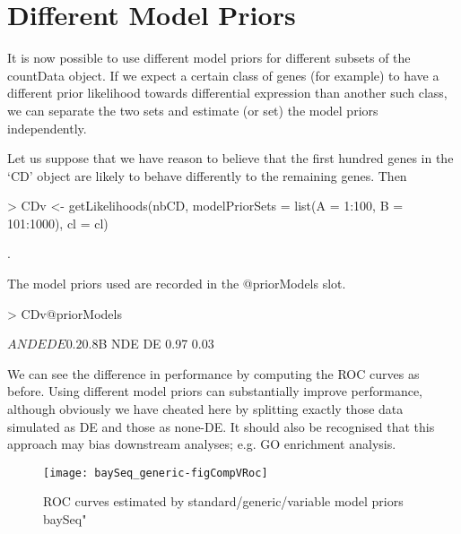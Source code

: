 \documentclass[a4paper]{article}
\begin{document}
\section{Different Model Priors}

It is now possible to use different model priors for different subsets of the countData object. If we expect a certain class of genes (for example) to have a different prior likelihood towards differential expression than another such class, we can separate the two sets and estimate (or set) the model priors independently.

Let us suppose that we have reason to believe that the first hundred genes in the `CD' object are likely to behave differently to the remaining genes. Then

\begin{Schunk}
\begin{Sinput}
> CDv <- getLikelihoods(nbCD, modelPriorSets = list(A = 1:100, B = 101:1000), cl = cl)
\end{Sinput}
\begin{Soutput}
.
\end{Soutput}
\end{Schunk}

The model priors used are recorded in the @priorModels slot.
\begin{Schunk}
\begin{Sinput}
> CDv@priorModels
\end{Sinput}
\begin{Soutput}
$A
NDE  DE 
0.2 0.8 

$B
 NDE   DE 
0.97 0.03 
\end{Soutput}
\end{Schunk}

We can see the difference in performance by computing the ROC curves as before. Using different model priors can substantially improve performance, although obviously we have cheated here by splitting exactly those data simulated as DE and those as none-DE. It should also be recognised that this approach may bias downstream analyses; e.g. GO enrichment analysis.


\begin{figure}[!ht]
\begin{center}
\texttt{[image: baySeq\_generic-figCompVRoc]}
\caption{ROC curves estimated by standard/generic/variable model priors baySeq"}
\label{figCompROC}
\end{center}
\end{figure}
\end{document}
